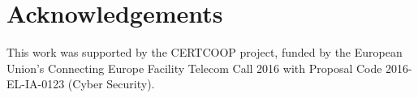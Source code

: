 \section{Acknowledgements}
This work was supported by the CERTCOOP project, funded by the European Union’s Connecting Europe Facility Telecom Call 2016 with Proposal Code 2016-EL-IA-0123 (Cyber Security).